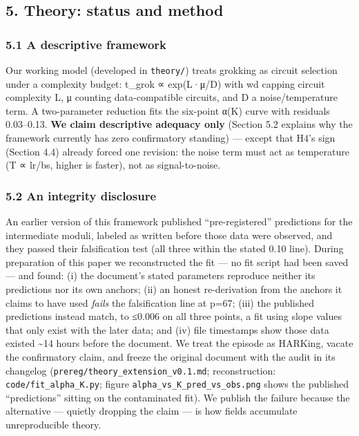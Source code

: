 \documentclass[
  11pt,
]{article}
\begin{document}
\subsection{5. Theory: status and
method}\label{theory-status-and-method}

\subsubsection{5.1 A descriptive
framework}\label{a-descriptive-framework}

Our working model (developed in \texttt{theory/}) treats grokking as
circuit selection under a complexity budget: t\_grok ∝ exp(L·μ/D) with
wd capping circuit complexity L, μ counting data-compatible circuits,
and D a noise/temperature term. A two-parameter reduction fits the
six-point α(K) curve with residuals 0.03--0.13. \textbf{We claim
descriptive adequacy only} (Section 5.2 explains why the framework
currently has zero confirmatory standing) --- except that H4's sign
(Section 4.4) already forced one revision: the noise term must act as
temperature (T ∝ lr/bs, higher is faster), not as signal-to-noise.

\subsubsection{5.2 An integrity
disclosure}\label{an-integrity-disclosure}

An earlier version of this framework published ``pre-registered''
predictions for the intermediate moduli, labeled as written before those
data were observed, and they passed their falsification test (all three
within the stated 0.10 line). During preparation of this paper we
reconstructed the fit --- no fit script had been saved --- and found:
(i) the document's stated parameters reproduce neither its predictions
nor its own anchors; (ii) an honest re-derivation from the anchors it
claims to have used \emph{fails} the falsification line at p=67; (iii)
the published predictions instead match, to ≤0.006 on all three points,
a fit using slope values that only exist with the later data; and (iv)
file timestamps show those data existed \textasciitilde14 hours before
the document. We treat the episode as HARKing, vacate the confirmatory
claim, and freeze the original document with the audit in its changelog
(\texttt{prereg/theory\_extension\_v0.1.md}; reconstruction:
\texttt{code/fit\_alpha\_K.py}; figure
\texttt{alpha\_vs\_K\_pred\_vs\_obs.png} shows the published
``predictions'' sitting on the contaminated fit). We publish the failure
because the alternative --- quietly dropping the claim --- is how fields
accumulate unreproducible theory.
\end{document}
